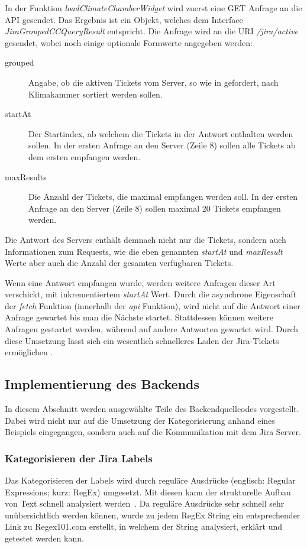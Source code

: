 In der Funktion \textit{loadClimateChamberWidget} wird zuerst eine GET Anfrage an die \gls{API} gesendet.
Das Ergebnis ist ein Objekt, welches dem Interface \textit{JiraGroupedCCQueryResult} entspricht.
Die Anfrage wird an die \gls{URI} \textit{/jira/active} gesendet, wobei noch einige optionale 
Formwerte angegeben werden:

\begin{description}
    \item[grouped]
    Angabe, ob die aktiven Tickets vom Server, so wie in 
    gefordert, nach Klimakammer sortiert werden sollen.

    \item[startAt]
    Der Startindex, ab welchem die Tickets in der Antwort enthalten werden sollen. In der ersten 
    Anfrage an den Server (Zeile 8) sollen alle Tickets ab dem ersten empfangen werden.

    \item[maxResults]
    Die Anzahl der Tickets, die maximal empfangen werden soll. In der ersten 
    Anfrage an den Server (Zeile 8) sollen maximal 20 Tickets empfangen werden.
\end{description}

Die Antwort des Servers enthält demnach nicht nur die Tickets, sondern auch Informationen
zum Requests, wie die eben genannten \textit{startAt} und \textit{maxResult} Werte
aber auch die Anzahl der gesamten verfügbaren Tickets.

Wenn eine Antwort empfangen wurde, werden weitere Anfragen dieser Art verschickt, mit inkrementiertem \textit{startAt} Wert.
Durch die asynchrone Eigenschaft der \textit{fetch} Funktion (innerhalb der \textit{api} Funktion),
wird nicht auf die Antwort einer Anfrage gewartet bis man die Nächste startet.
Stattdessen können weitere Anfragen gestartet werden, während auf andere Antworten gewartet wird.
Durch diese Umsetzung lässt sich ein wesentlich schnelleres Laden der Jira-Tickets ermöglichen .

\subsection{Implementierung des Backends}
In diesem Abschnitt werden ausgewählte Teile des Backendquellcodes vorgestellt.
Dabei wird nicht nur auf die Umsetzung der Kategorisierung anhand eines Beispiels eingegangen,
sondern auch auf die Kommunikation mit dem \gls{Jira} Server.

\subsubsection{Kategorisieren der Jira Labels}
Das Kategorisieren der Labels wird durch reguläre Ausdrücke (englisch: Regular 
Expressions; kurz: RegEx) umgesetzt. Mit diesen kann der strukturelle Aufbau 
von Text schnell analysiert werden~\cite{fitzgerald2012einstieg}. Da reguläre
Ausdrücke sehr schnell sehr unübersichtlich werden können, wurde zu jedem 
RegEx String ein entsprechender Link zu Regex101.com erstellt, in welchem der String
analysiert, erklärt und getestet werden kann.\\

